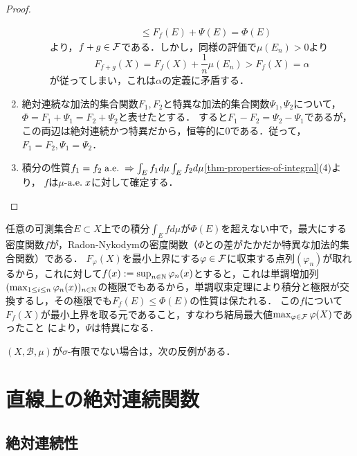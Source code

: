 \documentclass[uplatex, dvipdfmx]{jsreport}
\renewcommand{\B}{\mathcal{B}}
\begin{document}
\begin{proof}
\begin{enumerate}
\begin{description}
\begin{align*}
                &\le F_f(E)+\Psi(E)=\Phi(E)
            \end{align*}
            より，$f+g\in\mathcal{F}$である．しかし，同様の評価で$\mu(E_n)>0$より
            \[F_{f+g}(X)=F_f(X)+\frac{1}{n}\mu(E_n)>F_f(X)=\alpha\]
            が従ってしまい，これは$\alpha$の定義に矛盾する．
        \end{description}
        \item 絶対連続な加法的集合関数$F_1,F_2$と特異な加法的集合関数$\Psi_1,\Psi_2$について，$\Phi=F_1+\Psi_1=F_2+\Psi_2$と表せたとする．
        すると$F_1-F_2=\Psi_2-\Psi_1$であるが，この両辺は絶対連続かつ特異だから，恒等的に$0$である．従って，$F_1=F_2,\Psi_1=\Psi_2$．
        \item 積分の性質$f_1=f_2\;\mathrm{a.e.}\;\Rightarrow\int_Ef_1d\mu\int_Ef_2d\mu$\ref{thm-properties-of-integral}(4)より，
        $f$は$\mu$-$\mathrm{a.e.}\; x$に対して確定する．
    \end{enumerate}
\end{proof}
\begin{remarks}[列を巧みに用いた構成]
    \item 任意の可測集合$E\subset X$上での積分$\int_Efd\mu$が$\Phi(E)$を超えない中で，最大にする密度関数$f$が，Radon-Nykodymの密度関数（$\Phi$との差がたかだか特異な加法的集合関数）である．
    $F_\varphi(X)$を最小上界にする$\varphi\in\mathcal{F}$に収束する点列$(\varphi_n)$が取れるから，これに対して$f(x):=\sup_{n\in\mathbb{N}}\varphi_n(x)$とすると，これは単調増加列$(\max_{1\le i\le n}\varphi_n(x))_{n\in\mathbb{N}}$の極限でもあるから，単調収束定理により積分と極限が交換するし，その極限でも$F_f(E)\le\Phi(E)$の性質は保たれる．
    この$f$について$F_f(X)$が最小上界を取る元であること，すなわち結局最大値$\max_{\varphi\in\mathcal{F}}\varphi(X)$であったこと
    により，$\Psi$は特異になる．
\end{remarks}
\begin{counterexample}
    $(X,\B,\mu)$が$\sigma$-有限でない場合は，次の反例がある．
\end{counterexample}

\section{直線上の絶対連続関数}

\subsection{絶対連続性}
\end{document}
